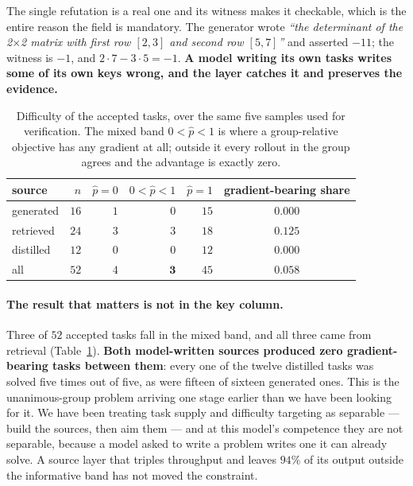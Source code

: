 The single refutation is a real one and its witness makes it checkable, which is the entire
reason the field is mandatory. The generator wrote \emph{``the determinant of the 2$\times$2
matrix with first row $[2,3]$ and second row $[5,7]$''} and asserted $-11$; the witness is
$-1$, and $2{\cdot}7 - 3{\cdot}5 = -1$. \textbf{A model writing its own tasks writes some of
its own keys wrong, and the layer catches it and preserves the evidence.}

\begin{table}[t]
\centering\small
\caption{Difficulty of the accepted tasks, over the same five samples used for verification.
The mixed band $0 < \hat{p} < 1$ is where a group-relative objective has any gradient at all;
outside it every rollout in the group agrees and the advantage is exactly zero.}
\label{tab:storediff}
\begin{tabular}{lrrrrc}
\toprule
source & $n$ & $\hat{p}=0$ & $0<\hat{p}<1$ & $\hat{p}=1$ & gradient-bearing share \\
\midrule
generated & $16$ & $1$ & $0$ & $15$ & $0.000$ \\
retrieved & $24$ & $3$ & $3$ & $18$ & $0.125$ \\
distilled & $12$ & $0$ & $0$ & $12$ & $0.000$ \\
\midrule
all       & $52$ & $4$ & $\mathbf{3}$ & $45$ & $\mathbf{0.058}$ \\
\bottomrule
\end{tabular}
\end{table}

\paragraph{The result that matters is not in the key column.} Three of $52$ accepted tasks fall
in the mixed band, and all three came from retrieval (Table~\ref{tab:storediff}). \textbf{Both
model-written sources produced zero gradient-bearing tasks between them}: every one of the
twelve distilled tasks was solved five times out of five, as were fifteen of sixteen generated
ones. This is the unanimous-group problem arriving one stage earlier than we have been looking
for it. We have been treating task supply and difficulty targeting as separable --- build the
sources, then aim them --- and at this model's competence they are not separable, because a
model asked to write a problem writes one it can already solve. A source layer that triples
throughput and leaves $94\%$ of its output outside the informative band has not moved the
constraint.

